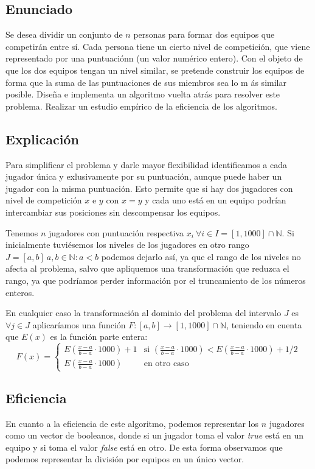 \subsection{Enunciado}
Se desea dividir un conjunto de $n$ personas para formar dos equipos que competirán entre sí.
Cada persona tiene un cierto nivel de competición, que viene representado por una puntuaciónn
(un valor numérico entero). Con el objeto de que los dos equipos tengan un nivel similar,
se pretende construir los equipos de forma que la suma de las puntuaciones de sus miembros
sea lo m ás similar posible. Diseña e implementa un algoritmo vuelta atrás para resolver este
problema. Realizar un estudio empírico de la eficiencia de los algoritmos.

\subsection{Explicación}
Para simplificar el problema y darle mayor flexibilidad identificamos a cada jugador única y exlusivamente por su puntuación, aunque puede haber un jugador con la misma puntuación. Esto permite que si hay dos jugadores con nivel de competición $x$ e $y$ con $x=y$ y cada uno está en un equipo podrían intercambiar sus posiciones sin descompensar los equipos.

Tenemos $n$ jugadores con puntuación respectiva $x_i\ \forall i\in I=[1, 1000]\cap \mathbb{N}$. Si inicialmente tuviésemos los niveles de los jugadores en otro rango $J=[a, b]\ a,b\in\mathbb{N}: a<b$ podemos dejarlo así, ya que el rango de los niveles no afecta al problema, salvo que apliquemos una transformación que reduzca el rango, ya que podríamos perder información por el truncamiento de los números enteros.

En cualquier caso la transformación al dominio del problema del intervalo $J$ es $\forall j\in J$ aplicaríamos una función $F:[a,b] \rightarrow [1,1000]\cap\mathbb{N}$, teniendo en cuenta que $E(x)$ es la función parte entera:
\[F(x) = \left\{
	\begin{matrix}
		E\left( \frac{x-a}{b-a}\cdot 1000 \right)+1  & 
		\mbox{si } \left( \frac{x-a}{b-a}\cdot 1000 \right) < 
					E\left( \frac{x-a}{b-a}\cdot 1000 \right) + 1/2

	 \\	E\left( \frac{x-a}{b-a}\cdot 1000 \right)    & 
	 	\mbox{en otro caso}
	\end{matrix}
	\right.
\]

\subsection{Eficiencia}
En cuanto a la eficiencia de este algoritmo, podemos representar los $n$ jugadores como un vector de booleanos, donde si un jugador toma el valor \textit{true} está en un equipo y si toma el valor \textit{false} está en otro. De esta forma observamos que podemos representar la división por equipos en un único vector.

